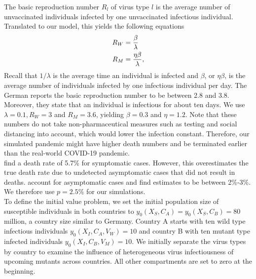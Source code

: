 The basic reproduction number $R_l$ of virus type $l$ is the average number of unvaccinated individuals infected by one unvaccinated infectious individual. Translated to our model, this yields the following equations 
\begin{align}
R_W &= \frac{\beta}{\lambda} \\
R_M &= \frac{\eta \beta}{\lambda}, \notag
\end{align}
Recall that $1/\lambda$ is the average time an individual is infected and $\beta$, or $\eta \beta$, is the average number of individuals infected by one infectious individual per day. The German \cite{RKI.2021} reports the basic reproduction number to be between 2.8 and 3.8. Moreover, they state that an individual is infectious for about ten days. We use $\lambda = 0.1, R_W = 3$ and $R_M = 3.6$, yielding $\beta = 0.3$ and $\eta = 1.2$. Note that these numbers do not take non-pharmaceutical measures such as testing and social distancing into account, which would lower the infection constant. Therefore, our simulated pandemic might have higher death numbers and be terminated earlier than the real-world COVID-19 pandemic. \\%

\cite{Baud.2020} find a death rate of 5.7\% for symptomatic cases. However, this overestimates the true death rate due to undetected asymptomatic cases that did not result in deaths. \cite{Wu.2020} account for asymptomatic cases and find estimates to be between 2\%-3\%. We therefore use $p=2.5\%$ for our simulations.\\

To define the initial value problem, we set the initial population size of susceptible individuals in both countries to $y_0(X_S, C_A) = y_0(X_S, C_B) = 80$ million, a country size similar to Germany. Country A starts with ten wild type infectious individuals $y_0(X_I, C_A, V_W) = 10$ and country B with ten mutant type infected individuals $y_0(X_I, C_B, V_M) = 10$. We initially separate the virus types by country to examine the influence of heterogeneous virus infectiousness of upcoming mutants across countries. All other compartments are set to zero at the beginning. \\

